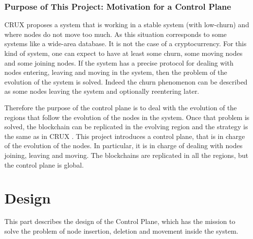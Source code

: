 \documentclass[a4paper,11pt,oneside]{report}
\begin{document}
\subsection{Purpose of This Project: Motivation for a Control Plane}

CRUX \cite{Basescu2014} proposes a system that is working in a stable system
(with low-churn) and where nodes do not move too much. As this situation
corresponds to some systems like a wide-area database. It is not
the case of a cryptocurrency. For this kind of system, one can expect to have
at least some churn, some moving nodes and some joining nodes. If the
system has a precise protocol for dealing with nodes entering, leaving and
moving in the system, then the problem of the evolution of the system is
solved. Indeed the churn phenomenon can be described as some nodes leaving the
system and optionally reentering later. 

Therefore the purpose of the control plane is to deal with the evolution
of the regions that follow the evolution of the nodes in the system. Once that
problem is solved, the blockchain can be replicated in the evolving region and
the strategy is the same as in CRUX \cite{Basescu2014}. This project
introduces a control plane, that is in charge of the evolution of the nodes. In
particular, it is in charge of dealing with nodes joining, leaving and
moving. The blockchains are replicated in all the regions, but the control
plane is global. 

\chapter{Design} \label{chap:Design} %

This part describes the design of the Control Plane, which has the mission
to solve the problem of node insertion, deletion and movement inside the
system.
\end{document}
